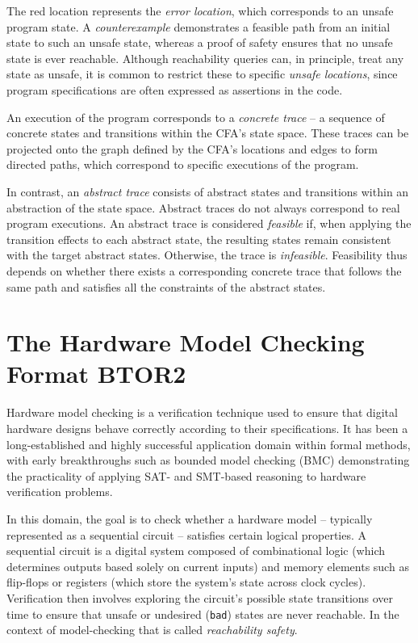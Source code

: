 The red location represents the \textit{error location}, which corresponds to an unsafe program state. A \textit{counterexample} demonstrates a feasible path from an initial state to such an unsafe state, whereas a proof of safety ensures that no unsafe state is ever reachable. Although reachability queries can, in principle, treat any state as unsafe, it is common to restrict these to specific \textit{unsafe locations}, since program specifications are often expressed as assertions in the code.

An execution of the program corresponds to a \textit{concrete trace} -- a sequence of concrete states and transitions within the CFA's state space. These traces can be projected onto the graph defined by the CFA's locations and edges to form directed paths, which correspond to specific executions of the program.

In contrast, an \textit{abstract trace} consists of abstract states and transitions within an abstraction of the state space. Abstract traces do not always correspond to real program executions. An abstract trace is considered \textit{feasible} if, when applying the transition effects to each abstract state, the resulting states remain consistent with the target abstract states. Otherwise, the trace is \textit{infeasible}. Feasibility thus depends on whether there exists a corresponding concrete trace that follows the same path and satisfies all the constraints of the abstract states.


\section{The Hardware Model Checking Format BTOR2}\label{sec:btor2}

Hardware model checking is a verification technique used to ensure that digital hardware designs behave correctly according to their specifications. It has been a long-established and highly successful application domain within formal methods, with early breakthroughs such as bounded model checking (BMC) \cite{boundedMC} demonstrating the practicality of applying SAT- and SMT-based reasoning to hardware verification problems.

In this domain, the goal is to check whether a hardware model -- typically represented as a sequential circuit -- satisfies certain logical properties. A sequential circuit is a digital system composed of combinational logic (which determines outputs based solely on current inputs) and memory elements such as flip-flops or registers (which store the system's state across clock cycles). Verification then involves exploring the circuit's possible state transitions over time to ensure that unsafe or undesired (\verb|bad|) states are never reachable. In the context of model-checking that is called \textit{reachability safety}.

